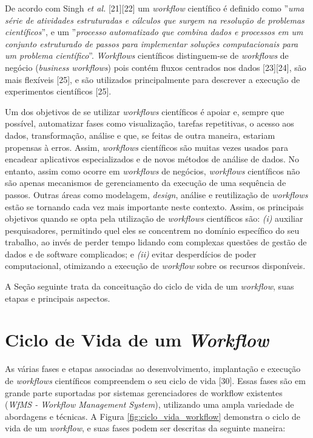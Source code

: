 De acordo com Singh \textit{et al.} [21][22] um \textit{workflow} científico é definido como ''\textit{uma série de atividades estruturadas e cálculos que surgem na resolução de problemas científicos}'', e um ''\textit{processo automatizado que combina dados e processos em um conjunto estruturado de passos para implementar soluções computacionais para um problema científico}''. \textit{Workflows} científicos distinguem-se de \textit{workflows} de negócio (\textit{business workflows}) pois contém fluxos centrados nos dados [23][24], são mais flexíveis [25], e são utilizados principalmente para descrever a execução de experimentos científicos [25].

Um dos objetivos de se utilizar \textit{workflows} científicos é apoiar e, sempre que possível, automatizar fases como visualização, tarefas repetitivas, o acesso aos dados, transformação, análise e que, se feitas de outra maneira, estariam propensas à erros. Assim, \textit{workflows} científicos são muitas vezes usados para encadear aplicativos especializados e de novos métodos de análise de dados. No entanto, assim como ocorre em \textit{workflows} de negócios, \textit{workflows} científicos não são apenas mecanismos de gerenciamento da execução de uma sequência de passos. Outras áreas como modelagem, \textit{design}, análise e reutilização de \textit{workflows} estão se tornando cada vez mais importante neste contexto. Assim, os principais objetivos quando se opta pela utilização de \textit{workflows} científicos são: \textit{(i)} auxiliar pesquisadores, permitindo quel eles se concentrem no domínio específico do seu trabalho, ao invés de perder tempo lidando com complexas questões de gestão de dados e de software complicados; e \textit{(ii)} evitar desperdícios de poder computacional, otimizando a execução de \textit{workflow} sobre os recursos disponíveis.

A Seção seguinte trata da conceituação do ciclo de vida de um \textit{workflow}, suas etapas e principais aspectos.

\section{Ciclo de Vida de um \textit{Workflow}} \label{cap3sec2}

As várias fases e etapas associadas ao desenvolvimento, implantação e execução de \textit{workflows} científicos compreendem o seu ciclo de vida [30]. Essas fases são em grande parte suportadas por sistemas gerenciadores de workflow existentes (\textit{WfMS - Workflow Management System}), utilizando uma ampla variedade de abordagens e técnicas. A Figura \ref{fig:ciclo_vida_workflow} demonstra o ciclo de vida de um \textit{workflow}, e suas fases podem ser descritas da seguinte maneira:

